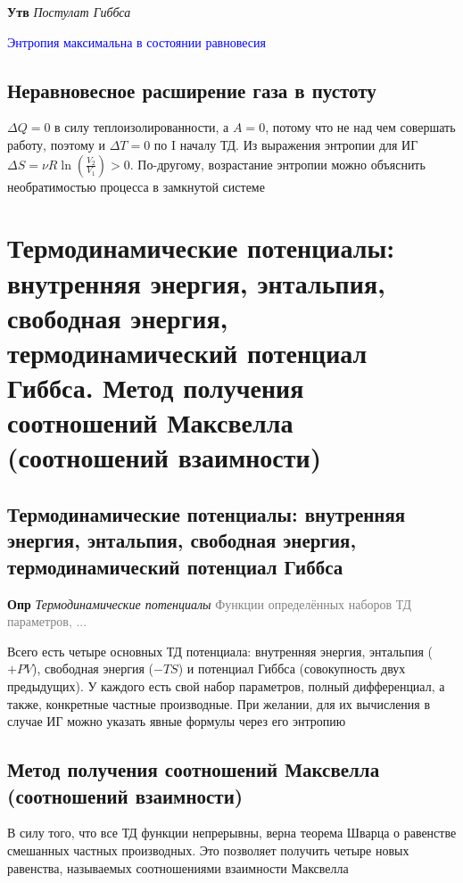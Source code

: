 \documentclass[a4paper, 14pt]{article}
\begin{document}
    \textbf{Утв} \textit{Постулат Гиббса}
    
    \textcolor{blue}{Энтропия максимальна в состоянии равновесия}
    
    \subsection{Неравновесное расширение газа в пустоту}
    
    $\Delta Q = 0$ в силу теплоизолированности, а $A = 0$, потому что не над чем совершать работу, поэтому и $\Delta
    T = 0$ по I началу ТД.
    Из выражения энтропии для ИГ $\Delta S = \nu R \ln \left(\frac{V_2}{V_1}\right) > 0$.
    По-другому, возрастание энтропии можно объяснить необратимостью процесса в замкнутой системе
    
    \section{Термодинамические потенциалы: внутренняя энергия, энтальпия, свободная энергия, термодинамический
    потенциал Гиббса.
    Метод получения соотношений Максвелла (соотношений взаимности)}
    
    \subsection{Термодинамические потенциалы: внутренняя энергия, энтальпия, свободная энергия, термодинамический
    потенциал Гиббса}
    
    \textbf{Опр} \textit{Термодинамические потенциалы} \textcolor{gray}{Функции определённых наборов ТД параметров, ...}
    
    Всего есть четыре основных ТД потенциала: внутренняя энергия, энтальпия ($+PV$), свободная энергия ($-TS$) и
    потенциал Гиббса (совокупность двух предыдущих).
    У каждого есть свой набор параметров, полный дифференциал, а также, конкретные частные производные.
    При желании, для их вычисления в случае ИГ можно указать явные формулы через его энтропию
    
    \subsection{Метод получения соотношений Максвелла (соотношений взаимности)}
    
    В силу того, что все ТД функции непрерывны, верна теорема Шварца о равенстве смешанных частных производных.
    Это позволяет получить четыре новых равенства, называемых соотношениями взаимности Максвелла
    
\end{document}
